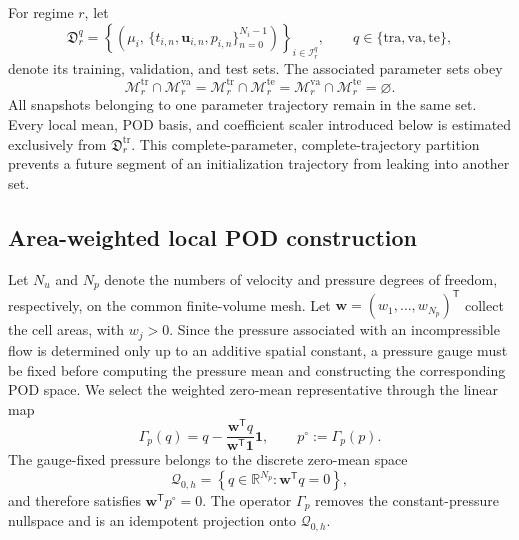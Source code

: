 For regime $r$, let
\begin{equation}
  \mathfrak{D}_{r}^{q}
  =
  \left\{
    \left(
      \mu_i,\,
      \{t_{i,n},\boldsymbol{u}_{i,n},p_{i,n}\}_{n=0}^{N_i-1}
    \right)
  \right\}_{i\in\mathcal{I}_{r}^{q}},
  \qquad
  q\in\{\mathrm{tra},\mathrm{va},\mathrm{te}\},
  \label{eq:trajectory_populations}
\end{equation}
denote its training, validation, and test sets.  The associated
parameter sets obey
\begin{equation}
  \mathcal{M}_{r}^{\mathrm{tr}}
  \cap\mathcal{M}_{r}^{\mathrm{va}}
  =
  \mathcal{M}_{r}^{\mathrm{tr}}
  \cap\mathcal{M}_{r}^{\mathrm{te}}
  =
  \mathcal{M}_{r}^{\mathrm{va}}
  \cap\mathcal{M}_{r}^{\mathrm{te}}
  =\varnothing .
  \label{eq:complete_re_isolation}
\end{equation}
All snapshots  belonging to one parameter trajectory
remain in the same set.  Every local mean, POD basis, and coefficient
scaler introduced below is estimated exclusively from
$\mathfrak{D}_{r}^{\mathrm{tr}}$. This complete-parameter,
complete-trajectory partition prevents a future segment of an initialization
trajectory from leaking into another set.



\subsection{Area-weighted local POD construction}
\label{subsec:local_pod_and_gauge}

Let $N_u$ and $N_p$ denote the numbers of velocity and pressure degrees of
freedom, respectively, on the common finite-volume mesh.  Let
$\boldsymbol{w}=(w_1,\ldots,w_{N_p})^{\mathsf T}$ collect the cell areas,
with $w_j>0$.  Since the pressure associated with an incompressible flow is
determined only up to an additive spatial constant, a pressure gauge must be
fixed before computing the pressure mean and constructing the corresponding
POD space.  We select the weighted zero-mean representative through the
linear map
\begin{equation}
\Gamma_p(q) = q-\frac{\boldsymbol{w}^{\mathsf T}q}
{\boldsymbol{w}^{\mathsf T}\boldsymbol{1}}\boldsymbol{1},
\qquad
p^\circ:=\Gamma_p(p).
\label{eq:pressure_gauge}
\end{equation}
The gauge-fixed pressure belongs to the discrete zero-mean space
\begin{equation}
\mathcal{Q}_{0,h} = \left\{
q\in\mathbb{R}^{N_p}:
\boldsymbol{w}^{\mathsf T}q=0
\right\},
\label{eq:discrete_zero_mean_pressure_space}
\end{equation}
and therefore satisfies
$\boldsymbol{w}^{\mathsf T}p^\circ=0$.  The operator $\Gamma_p$ removes the
constant-pressure nullspace and is an idempotent projection onto
$\mathcal{Q}_{0,h}$.

